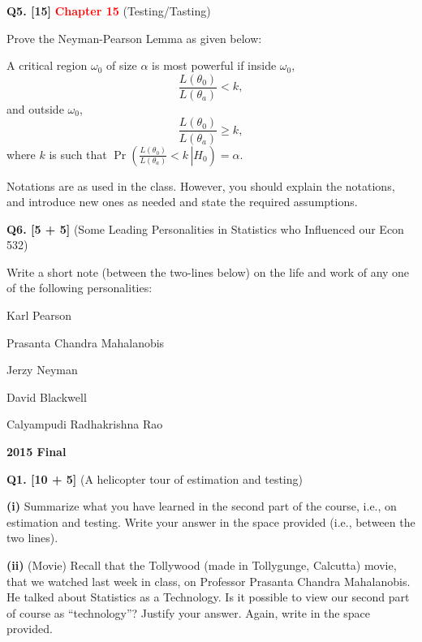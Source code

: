 \documentclass[11pt]{article}
\begin{document}
\textbf{Q5. [15]} \textbf{\textcolor{red}{Chapter 15}} (Testing/Tasting)

Prove the Neyman-Pearson Lemma as given below:

A critical region $\omega_0$ of size $\alpha$ is most powerful if inside $\omega_0$,
\[
\frac{L(\theta_0)}{L(\theta_a)}<k,
\]
and outside $\omega_0$,
\[
\frac{L(\theta_0)}{L(\theta_a)}\geq k,
\]
where $k$ is such that $\Pr\left(\left.\frac{L(\theta_0)}{L(\theta_a)}<k\,\right|H_0\right)=\alpha$.

Notations are as used in the class. However, you should explain the notations, and introduce new ones as needed and state the required assumptions.

\bigskip

\textbf{Q6. [5 + 5]} (Some Leading Personalities in Statistics who Influenced our Econ 532)

Write a short note (between the two-lines below) on the life and work of any one of the following personalities:

Karl Pearson

Prasanta Chandra Mahalanobis

Jerzy Neyman

David Blackwell

Calyampudi Radhakrishna Rao


\clearpage

\begin{center}
    {\Large\bfseries 2015 Final}
\end{center}

\vspace{1em}

\textbf{Q1. [10 + 5]} (A helicopter tour of estimation and testing)

\textbf{(i)} Summarize what you have learned in the second part of the course, i.e., on estimation and testing. Write your answer in the space provided (i.e., between the two lines).

\textbf{(ii)} (Movie) Recall that the Tollywood (made in Tollygunge, Calcutta) movie, that we watched last week in class, on Professor Prasanta Chandra Mahalanobis. He talked about Statistics as a Technology. Is it possible to view our second part of course as ``technology''? Justify your answer. Again, write in the space provided.
\end{document}
